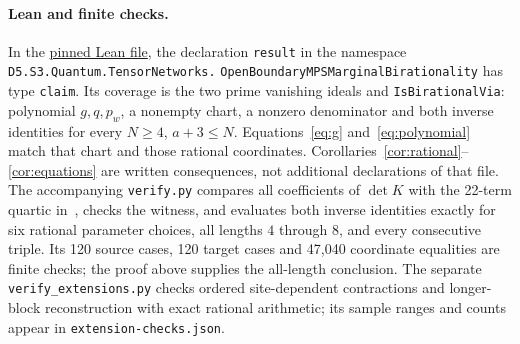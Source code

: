 \documentclass[11pt]{article}
\begin{document}
\paragraph{Lean and finite checks.}
In the
\href{https://github.com/the-omega-institute/trureturing/blob/b95cdbb8cccca425964251ba38cc0b0e517e478a/D5/S3/Quantum/TensorNetworks/OpenBoundaryMPSMarginalBirationality.lean}{pinned Lean file},
the declaration \texttt{result} in the namespace
\texttt{D5.S3.Quantum.TensorNetworks.}\allowbreak
\texttt{OpenBoundaryMPSMarginalBirationality}
has type \texttt{claim}. Its coverage is the two prime vanishing ideals and
\texttt{IsBirationalVia}: polynomial $g,q,p_w$, a nonempty chart, a nonzero
denominator and both inverse identities for every $N\geq4$, $a+3\leq N$.
Equations~\eqref{eq:g} and~\eqref{eq:polynomial} match that chart and those
rational coordinates. Corollaries~\ref{cor:rational}--\ref{cor:equations}
are written consequences, not additional declarations of that file.
The accompanying \texttt{verify.py} compares all coefficients of
$\det K$ with the 22-term quartic in~\cite[Theorem 7]{CM}, checks the witness,
and evaluates both inverse identities exactly for six rational parameter
choices, all lengths $4$ through $8$, and every consecutive triple.
Its 120 source cases, 120 target cases and 47,040 coordinate equalities
are finite checks; the proof above supplies the all-length conclusion.
The separate \texttt{verify\_extensions.py} checks ordered site-dependent
contractions and longer-block reconstruction with exact rational arithmetic;
its sample ranges and counts appear in \texttt{extension-checks.json}.
\end{document}

